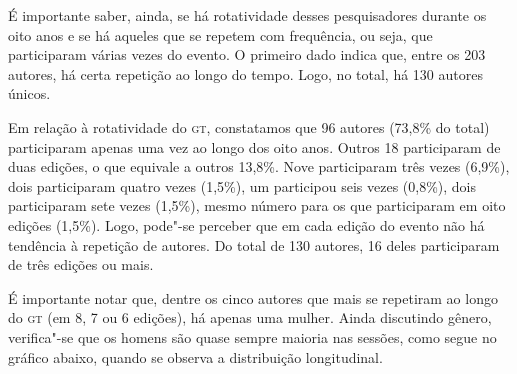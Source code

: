 É importante saber, ainda, se há rotatividade desses pesquisadores
durante os oito anos e se há aqueles que se repetem com frequência,
ou seja, que participaram várias vezes do evento. O primeiro dado indica
que, entre os 203 autores, há certa repetição ao longo do tempo.
Logo, no total, há 130 autores únicos. 

Em relação à rotatividade do \textsc{gt}, constatamos que
96 autores (73,8\% do total) participaram
apenas uma vez ao longo dos oito anos. Outros 18 participaram de duas
edições, o que equivale a outros 13,8\%. Nove participaram três vezes (6,9\%), dois participaram quatro vezes (1,5\%), um participou seis vezes (0,8\%), dois participaram sete vezes (1,5\%), mesmo número para os que participaram em oito edições (1,5\%).
Logo, pode"-se perceber que em
cada edição do evento não há tendência à repetição de autores. Do
total de 130 autores, 16 deles participaram de três edições ou
mais.

É importante notar que, dentre os cinco autores que mais se
repetiram ao longo do \textsc{gt} (em 8, 7 ou 6 edições), há apenas uma mulher.
Ainda discutindo gênero, verifica"-se que os homens são quase sempre
maioria nas sessões, como segue no gráfico abaixo, quando se observa a
distribuição longitudinal.


